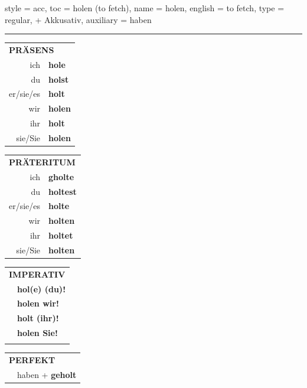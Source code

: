\begin{verbentry}{
  style = {acc},
  toc = {holen (to fetch)},
  name = {holen},
  english = {to fetch},
  type = {regular, + Akkusativ},
  auxiliary = {haben}
}
 
    
     \vspace{5pt}

    \hrule
    
    \vspace{5pt}

  \begin{tabular}{rl}
     \multicolumn{2}{l}{\textbf{PRÄSENS} }\\
    ich & \textbf{hole}\\
    du & \textbf{holst}\\
    er/sie/es & \textbf{holt}\\
    wir & \textbf{holen}\\
    ihr & \textbf{holt}\\
    sie/Sie & \textbf{holen}\\
  \end{tabular}
  \hfill
     \begin{tabular}{rl}
    \multicolumn{2}{l}{\textbf{PRÄTERITUM} }\\
    ich & \textbf{gholte}\\
    du & \textbf{holtest}\\
    er/sie/es & \textbf{holte}\\
    wir & \textbf{holten}\\
    ihr & \textbf{holtet}\\
    sie/Sie & \textbf{holten}\\
  \end{tabular}
  \hfill
  \begin{tabular}{rl}
     \multicolumn{2}{l}{\textbf{IMPERATIV} }\\
   & \textbf{hol(e) (du)!}\\
   & \textbf{holen wir!}\\
   & \textbf{holt (ihr)!}\\
   & \textbf{holen Sie!}\\
   & \vspace{10pt}
  \end{tabular}

    \vspace{10pt}

 \begin{tabular}{rl}
     \multicolumn{2}{l}{\textbf{PERFEKT}}\\
   & haben + \textbf{geholt}\\
  \end{tabular}
\hfill
   \begin{tabular}{rl}
   

\end{tabular}
\end{verbentry}
